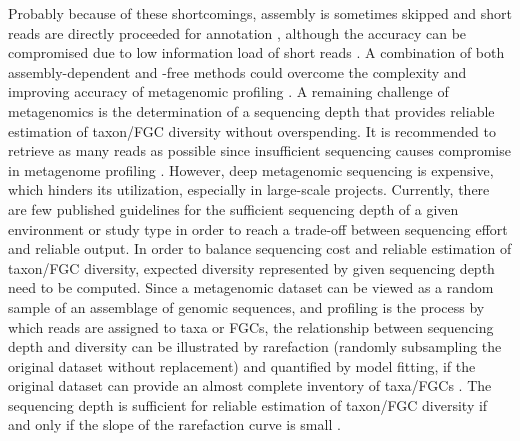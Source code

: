 \documentclass[11pt]{article}
\begin{document}
  Probably because of these shortcomings, assembly is sometimes skipped and short reads are directly proceeded for annotation \citep{tringe2005comparative,abubucker2012metabolic,vermote2018amplicon,bovo2018shotgun}, although the accuracy can be compromised due to low information load of short reads \citep{wommack2008metagenomics,carr2014comparative,tran2020assembling}. 
  A combination of both assembly-dependent and -free methods could overcome the complexity and improving accuracy of metagenomic profiling \citep{becker2020modular}.
  \newline
  A remaining challenge of metagenomics is the determination of a sequencing depth that provides reliable estimation of taxon/FGC diversity without overspending. 
  It is recommended to retrieve as many reads as possible \citep{quince2017shotgun} since insufficient sequencing causes compromise in metagenome profiling \citep{cattonaro2018you,zaheer2018impact,pereira2019impact,gweon2019impact}. 
  However, deep metagenomic sequencing is expensive, which hinders its utilization, especially in large-scale projects. 
  Currently, there are few published guidelines for the sufficient sequencing depth of a given environment or study type in order to reach a trade-off between sequencing effort and reliable output. 
  \newline
  In order to balance sequencing cost and reliable estimation of taxon/FGC diversity, expected diversity represented by given sequencing depth need to be computed. 
  Since a metagenomic dataset can be viewed as a random sample of an assemblage of genomic sequences, and profiling is the process by which reads are assigned to taxa or FGCs, the relationship between sequencing depth and diversity can be illustrated by rarefaction (randomly subsampling the original dataset without replacement) and quantified by model fitting, if the original dataset can provide an almost complete inventory of taxa/FGCs \citep{heck1975explicit,hortal2005ed,gomez2014using,hughes2021sampling}. 
  The sequencing depth is sufficient for reliable estimation of taxon/FGC diversity if and only if the slope of the rarefaction curve is small \citep{hortal2005ed,chao2012coverage,roswell2021conceptual}. 
\end{document}
